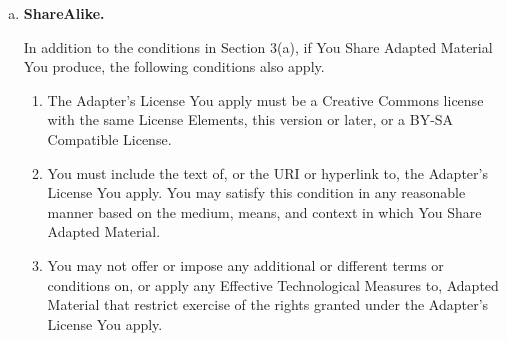 {\begin{enumerate}[a.]
\begin{enumerate}[1.]
\begin{enumerate}[A.]
\item retain the following if it is supplied by the Licensor with the Licensed Material:
identification of the creator(s) of the Licensed Material and any others designated to receive attribution, in any reasonable manner requested by the Licensor (including by pseudonym if designated);
a copyright notice;
\begin{enumerate}[i.]
\item a notice that refers to this Public License;
\item a notice that refers to the disclaimer of warranties;
\item a URI or hyperlink to the Licensed Material to the extent reasonably practicable;
\end{enumerate}

\item indicate if You modified the Licensed Material and retain an indication of any previous modifications; and
\item indicate the Licensed Material is licensed under this Public License, and include the text of, or the URI or hyperlink to, this Public License.
\end{enumerate}

\item You may satisfy the conditions in Section 3(a)(1) in any reasonable manner based on the medium, means, and context in which You Share the Licensed Material. For example, it may be reasonable to satisfy the conditions by providing a URI or hyperlink to a resource that includes the required information.

\item If requested by the Licensor, You must remove any of the information required by Section 3(a)(1)(A) to the extent reasonably practicable.
\end{enumerate}

\item \textbf{ShareAlike.}

In addition to the conditions in Section 3(a), if You Share Adapted Material You produce, the following conditions also apply.

\begin{enumerate}[1.]
\item The Adapter’s License You apply must be a Creative Commons license with the same License Elements, this version or later, or a BY-SA Compatible License.
\item You must include the text of, or the URI or hyperlink to, the Adapter's License You apply. You may satisfy this condition in any reasonable manner based on the medium, means, and context in which You Share Adapted Material.
\item You may not offer or impose any additional or different terms or conditions on, or apply any Effective Technological Measures to, Adapted Material that restrict exercise of the rights granted under the Adapter's License You apply.
\end{enumerate}
\end{enumerate}

}
